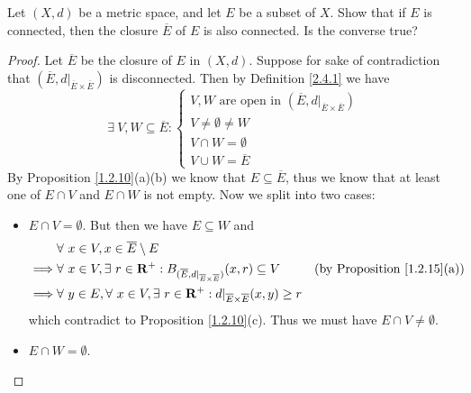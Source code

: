 \begin{exercise}\label{ex 2.4.8}
    Let \((X, d)\) be a metric space, and let \(E\) be a subset of \(X\).
    Show that if \(E\) is connected, then the closure \(\overline{E}\) of \(E\) is also connected.
    Is the converse true?
\end{exercise}

\begin{proof}
    Let \(\overline{E}\) be the closure of \(E\) in \((X, d)\).
    Suppose for sake of contradiction that \((\overline{E}, d|_{\overline{E} \times \overline{E}})\) is disconnected.
    Then by Definition \ref{2.4.1} we have
    \[
        \exists\ V, W \subseteq \overline{E} : \begin{cases}
            V, W \text{ are open in } (\overline{E}, d|_{\overline{E} \times \overline{E}}) \\
            V \neq \emptyset \neq W                                                         \\
            V \cap W = \emptyset                                                            \\
            V \cup W = \overline{E}
        \end{cases}
    \]
    By Proposition \ref{1.2.10}(a)(b) we know that \(E \subseteq \overline{E}\), thus we know that at least one of \(E \cap V\) and \(E \cap W\) is not empty.
    Now we split into two cases:
    \begin{itemize}
        \item \(E \cap V = \emptyset\).
              But then we have \(E \subseteq W\) and
              \begin{align*}
                           & \forall\ x \in V, x \in \overline{E} \setminus E                                                                                                                      \\
                  \implies & \forall\ x \in V, \exists\ r \in \mathbf{R}^+ : B_{(\overline{E}, d|_{\overline{E} \times \overline{E}})}(x, r) \subseteq V & \text{(by Proposition \ref{1.2.15}(a))} \\
                  \implies & \forall\ y \in E, \forall\ x \in V, \exists\ r \in \mathbf{R}^+ : d|_{\overline{E} \times \overline{E}}(x, y) \geq r
              \end{align*}
              which contradict to Proposition \ref{1.2.10}(c).
              Thus we must have \(E \cap V \neq \emptyset\).
        \item \(E \cap W = \emptyset\).

\end{itemize}
\end{proof}
